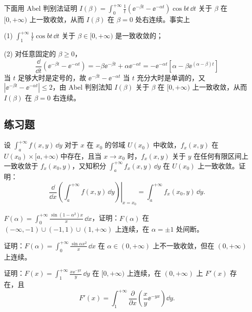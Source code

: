 \begin{xsolution}
下面用 Abel 判别法证明 $I(\beta)=\displaystyle\int_0^{+\infty}\frac1t(\ee^{-\beta t}-\ee^{-\alpha t})\cos bt\,\dd t$ 关于 $\beta$ 在 $[0,+\infty)$ 上一致收敛，从而 $I(\beta)$ 在 $\beta=0$ 处右连续。事实上

(1) $\displaystyle\int_1^{+\infty}\frac1t\cos bt\,\dd t$ 关于 $\beta\in[0,+\infty)$ 是一致收敛的；

(2) 对任意固定的 $\beta\geqslant0$，
\[
  \frac{\dd}{\dd t}(\ee^{-\beta t}-\ee^{-\alpha t})=-\beta\ee^{-\beta t}+\alpha\ee^{-\alpha t}
  =-\ee^{-\alpha t}[\alpha-\beta\ee^{(\alpha-\beta)t}]
\]
当 $t$ 足够大时是定号的，故 $\ee^{-\beta t}-\ee^{-\alpha t}$ 当 $t$ 充分大时是单调的，又 $|\ee^{-\beta t}-\ee^{-\alpha t}|\leqslant2$，由 Abel 判别法知 $I(\beta)$ 关于 $\beta$ 在 $[0,+\infty)$ 上一致收敛，从而 $I(\beta)$ 在 $\beta=0$ 右连续。
\end{xsolution}

\subsection{练习题}
\begin{xexercise}[1]
设 $\displaystyle\int_a^{+\infty}f(x,y)\,\dd y$ 对于 $x$ 在 $x_0$ 的邻域 $U(x_0)$ 中收敛，$f_x(x,y)$ 在 $U(x_0)\times[a,+\infty)$ 中存在，且当 $x\to x_0$ 时，$f_x(x,y)$ 关于 $y$ 在任何有限区间上一致收敛于 $f_x(x_0,y)$，又知积分 $\displaystyle\int_a^{+\infty}f_x(x,y)\,\dd y$ 在 $U(x_0)$ 上一致收敛。证明：
  \[
    \left.\frac{\dd}{\dd x}\left(\int_a^{+\infty}f(x,y)\,\dd y\right)\right|_{x=x_0}
    =\int_a^{+\infty}f_x(x_0,y)\,\dd y.
  \]
\end{xexercise}

\begin{xexercise}[2]
$F(\alpha)=\displaystyle\int_0^{+\infty}\frac{\sin(1-\alpha^2)x}{x}\,\dd x$，证明：$F(\alpha)$ 在 $(-\infty,-1)\cup(-1,1)\cup(1,+\infty)$ 上连续，在 $\alpha=\pm1$ 处间断。
\end{xexercise}

\begin{xexercise}[3]
证明：$F(\alpha)=\displaystyle\int_0^{+\infty}\frac{\sin\alpha x^2}{x}\,\dd x$ 在 $\alpha\in(0,+\infty)$ 上不一致收敛，但在 $(0,+\infty)$ 上连续。
\end{xexercise}

\begin{xexercise}[4]
证明：$F(x)=\displaystyle\int_1^{+\infty}\frac{x\ee^{-yx}}{y}\,\dd y$ 在 $[0,+\infty)$ 上连续，在 $(0,+\infty)$ 上 $F'(x)$ 存在，且
  \[
    F'(x)=\int_1^{+\infty}\frac{\partial}{\partial x}\left(\frac{x}{y}\ee^{-yx}\right)\dd y.
  \]
\end{xexercise}

